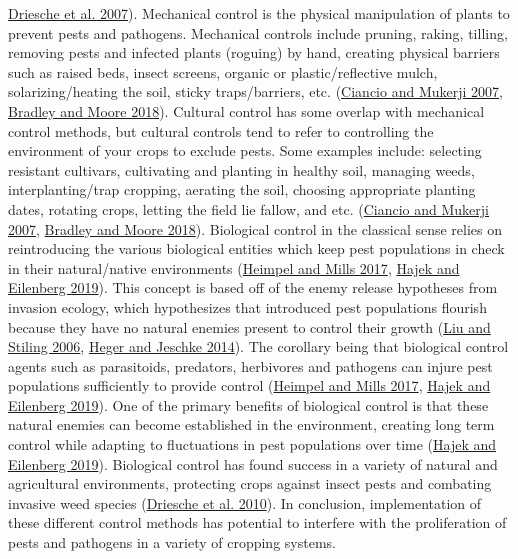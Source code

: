 \documentclass{ufdissertation}[overrideChapters] %
\begin{document}
{\protect\hyperlink{ref-Driesche2007}{Driesche et al. 2007}). Mechanical control is the physical manipulation of plants to prevent pests and pathogens. Mechanical controls include pruning, raking, tilling, removing pests and infected plants (roguing) by hand, creating physical barriers such as raised beds, insect screens, organic or plastic/reflective mulch, solarizing/heating the soil, sticky traps/barriers, etc. (\protect\hyperlink{ref-Ciancio2007}{Ciancio and Mukerji 2007}, \protect\hyperlink{ref-Bradley2018}{Bradley and Moore 2018}). Cultural control has some overlap with mechanical control methods, but cultural controls tend to refer to controlling the environment of your crops to exclude pests. Some examples include: selecting resistant cultivars, cultivating and planting in healthy soil, managing weeds, interplanting/trap cropping, aerating the soil, choosing appropriate planting dates, rotating crops, letting the field lie fallow, and etc. (\protect\hyperlink{ref-Ciancio2007}{Ciancio and Mukerji 2007}, \protect\hyperlink{ref-Bradley2018}{Bradley and Moore 2018}). Biological control in the classical sense relies on reintroducing the various biological entities which keep pest populations in check in their natural/native environments (\protect\hyperlink{ref-Heimpel2017}{Heimpel and Mills 2017}, \protect\hyperlink{ref-Hajek2019}{Hajek and Eilenberg 2019}). This concept is based off of the enemy release hypotheses from invasion ecology, which hypothesizes that introduced pest populations flourish because they have no natural enemies present to control their growth (\protect\hyperlink{ref-Liu2006}{Liu and Stiling 2006}, \protect\hyperlink{ref-Heger2014}{Heger and Jeschke 2014}). The corollary being that biological control agents such as parasitoids, predators, herbivores and pathogens can injure pest populations sufficiently to provide control (\protect\hyperlink{ref-Heimpel2017}{Heimpel and Mills 2017}, \protect\hyperlink{ref-Hajek2019}{Hajek and Eilenberg 2019}). One of the primary benefits of biological control is that these natural enemies can become established in the environment, creating long term control while adapting to fluctuations in pest populations over time (\protect\hyperlink{ref-Hajek2019}{Hajek and Eilenberg 2019}). Biological control has found success in a variety of natural and agricultural environments, protecting crops against insect pests and combating invasive weed species (\protect\hyperlink{ref-Driesche2010}{Driesche et al. 2010}). In conclusion, implementation of these different control methods has potential to interfere with the proliferation of pests and pathogens in a variety of cropping systems.
\begin{figure}


\end{figure}}
\end{document}
